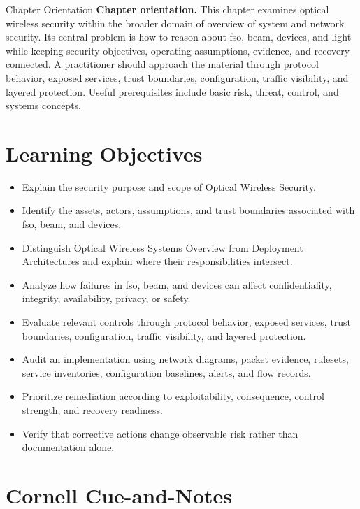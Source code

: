 \documentclass[11pt,letterpaper]{article}
\title{\CornellDocumentTitle}
\author{}
\date{}
\begin{document}
\maketitle
\begin{CornellOverviewBox}{Chapter Orientation}
\textbf{Chapter orientation.} This chapter examines optical wireless security within the broader domain of overview of system and network security. Its central problem is how to reason about fso, beam, devices, and light while keeping security objectives, operating assumptions, evidence, and recovery connected. A practitioner should approach the material through protocol behavior, exposed services, trust boundaries, configuration, traffic visibility, and layered protection. Useful prerequisites include basic risk, threat, control, and systems concepts.
\end{CornellOverviewBox}
\section*{Learning Objectives}
\begin{itemize}
\item Explain the security purpose and scope of Optical Wireless Security.
\item Identify the assets, actors, assumptions, and trust boundaries associated with fso, beam, and devices.
\item Distinguish Optical Wireless Systems Overview from Deployment Architectures and explain where their responsibilities intersect.
\item Analyze how failures in fso, beam, and devices can affect confidentiality, integrity, availability, privacy, or safety.
\item Evaluate relevant controls through protocol behavior, exposed services, trust boundaries, configuration, traffic visibility, and layered protection.
\item Audit an implementation using network diagrams, packet evidence, rulesets, service inventories, configuration baselines, alerts, and flow records.
\item Prioritize remediation according to exploitability, consequence, control strength, and recovery readiness.
\item Verify that corrective actions change observable risk rather than documentation alone.
\end{itemize}
\section*{Cornell Cue-and-Notes}
\end{document}
